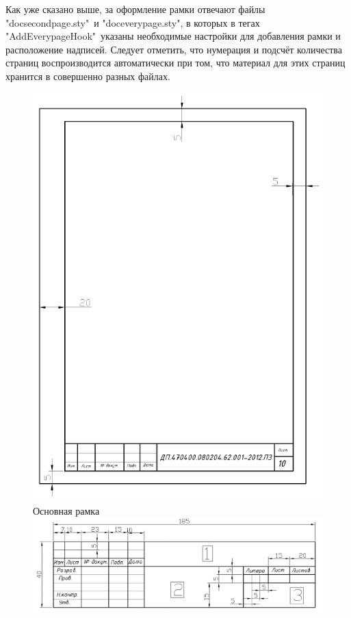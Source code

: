 		Как уже сказано выше, за оформление рамки отвечают файлы \\ "docsecondpage.sty"\ и "doceverypage.sty", в которых в тегах "AddEverypageHook"\ указаны
		необходимые настройки для добавления рамки и расположение надписей. Следует отметить, что нумерация и подсчёт количества страниц воспроизводится
		автоматически при том, что материал для этих страниц хранится в совершенно разных файлах.
			\begin{figure}[!htb]
					\includegraphics[width=\linewidth]{src/images/frame1.png}
					\centering
					Основная рамка
				\endminipage\hfill
					\centering
					\includegraphics[width=\linewidth]{src/images/frame2.png}

\end{figure}
